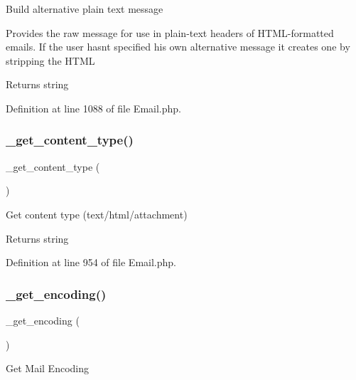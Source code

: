 Build alternative plain text message

Provides the raw message for use in plain-\/text headers of H\+T\+M\+L-\/formatted emails. If the user hasn\textquotesingle{}t specified his own alternative message it creates one by stripping the H\+T\+ML

\begin{DoxyReturn}{Returns}
string 
\end{DoxyReturn}


Definition at line 1088 of file Email.\+php.

\mbox{\label{class_c_i___email_a0df0801e489187b9f8108ec776f98f2e}} 
\subsubsection{\texorpdfstring{\_get\_content\_type()}{\_get\_content\_type()}}
{\footnotesize\ttfamily \+\_\+get\+\_\+content\+\_\+type (\begin{DoxyParamCaption}{ }\end{DoxyParamCaption})\hspace{0.3cm}{\ttfamily [protected]}}

Get content type (text/html/attachment)

\begin{DoxyReturn}{Returns}
string 
\end{DoxyReturn}


Definition at line 954 of file Email.\+php.

\mbox{\label{class_c_i___email_ab7a90b9198c0384a2a330728f2c78ebd}} 
\subsubsection{\texorpdfstring{\_get\_encoding()}{\_get\_encoding()}}
{\footnotesize\ttfamily \+\_\+get\+\_\+encoding (\begin{DoxyParamCaption}{ }\end{DoxyParamCaption})\hspace{0.3cm}{\ttfamily [protected]}}

Get Mail Encoding

